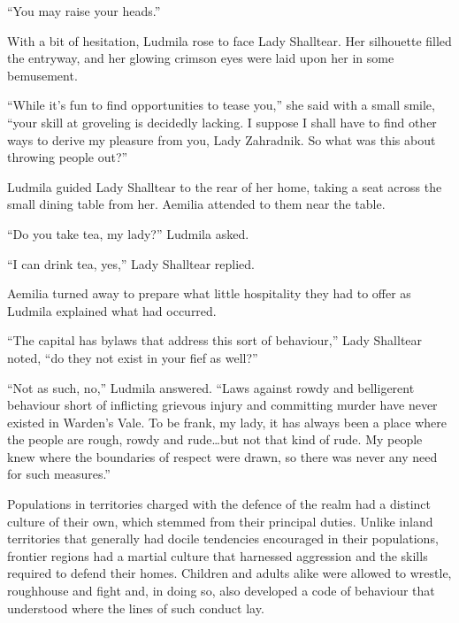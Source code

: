  

“You may raise your heads.”

 

With a bit of hesitation, Ludmila rose to face Lady Shalltear. Her silhouette filled the entryway, and her glowing crimson eyes were laid upon her in some bemusement.

 

“While it’s fun to find opportunities to tease you,” she said with a small smile, “your skill at groveling is decidedly lacking. I suppose I shall have to find other ways to derive my pleasure from you, Lady Zahradnik. So what was this about throwing people out?”

 

Ludmila guided Lady Shalltear to the rear of her home, taking a seat across the small dining table from her. Aemilia attended to them near the table.

 

“Do you take tea, my lady?” Ludmila asked.

 

“I can drink tea, yes,” Lady Shalltear replied.

 

Aemilia turned away to prepare what little hospitality they had to offer as Ludmila explained what had occurred.

 

“The capital has bylaws that address this sort of behaviour,” Lady Shalltear noted, “do they not exist in your fief as well?”

 

“Not as such, no,” Ludmila answered. “Laws against rowdy and belligerent behaviour short of inflicting grievous injury and committing murder have never existed in Warden’s Vale. To be frank, my lady, it has always been a place where the people are rough, rowdy and rude…but not that kind of rude. My people knew where the boundaries of respect were drawn, so there was never any need for such measures.”

 

Populations in territories charged with the defence of the realm had a distinct culture of their own, which stemmed from their principal duties. Unlike inland territories that generally had docile tendencies encouraged in their populations, frontier regions had a martial culture that harnessed aggression and the skills required to defend their homes. Children and adults alike were allowed to wrestle, roughhouse and fight and, in doing so, also developed a code of behaviour that understood where the lines of such conduct lay.

